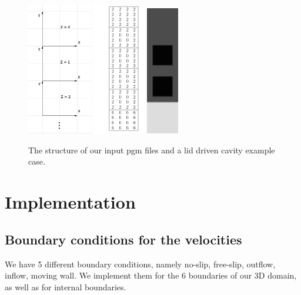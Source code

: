\documentclass[a4paper, 12pt]{article}
\begin{document}
\begin{figure}[hb!]
\centering
\label{fig1}
\includegraphics[height=5.8cm]{coord.jpg}
\includegraphics[height=5.8cm]{cavity2.jpg}
\includegraphics[height=5.65cm]{cavity20202.jpg}
\caption{The structure of our input pgm files and a lid driven cavity example case.}
\end{figure}


\section{Implementation}\label{sec:implement}
\subsection{Boundary conditions for the velocities}\label{sec:boundary_vel}
We have 5 different boundary conditions, namely no-slip, free-slip, outflow, inflow, moving wall. We implement them for the 6 boundaries of our 3D domain, as well as for internal boundaries.
\end{document}
